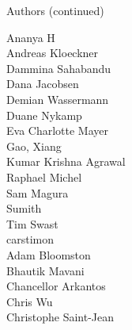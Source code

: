\begin{frame}{Authors (continued)}
\begin{multicols}{5}
Ananya H\\
Andreas Kloeckner\\
Dammina Sahabandu\\
Dana Jacobsen\\
Demian Wassermann\\
Duane Nykamp\\
Eva Charlotte Mayer\\
Gao, Xiang\\
Kumar Krishna Agrawal\\
Raphael Michel\\
Sam Magura\\
Sumith\\
Tim Swast\\
carstimon\\
Adam Bloomston\\
Bhautik Mavani\\
Chancellor Arkantos\\
Chris Wu\\
Christophe Saint-Jean\\
\end{multicols}
\end{frame}
